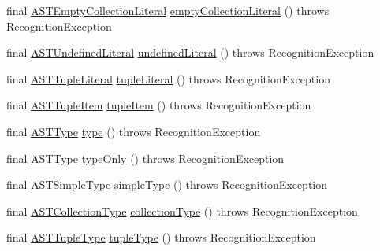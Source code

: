 \begin{DoxyCompactItemize}
\item 
final \hyperlink{classorg_1_1tzi_1_1use_1_1parser_1_1ocl_1_1_a_s_t_empty_collection_literal}{A\-S\-T\-Empty\-Collection\-Literal} \hyperlink{classorg_1_1tzi_1_1use_1_1parser_1_1ocl_1_1_o_c_l_parser_ab2cdacf60ff94da776d96c9db47185f8}{empty\-Collection\-Literal} ()  throws Recognition\-Exception 
\item 
final \hyperlink{classorg_1_1tzi_1_1use_1_1parser_1_1ocl_1_1_a_s_t_undefined_literal}{A\-S\-T\-Undefined\-Literal} \hyperlink{classorg_1_1tzi_1_1use_1_1parser_1_1ocl_1_1_o_c_l_parser_abab2814c454212e9460ff7c628ba40c5}{undefined\-Literal} ()  throws Recognition\-Exception 
\item 
final \hyperlink{classorg_1_1tzi_1_1use_1_1parser_1_1ocl_1_1_a_s_t_tuple_literal}{A\-S\-T\-Tuple\-Literal} \hyperlink{classorg_1_1tzi_1_1use_1_1parser_1_1ocl_1_1_o_c_l_parser_a9a2d5d1e0317db3fae49c21f59e16033}{tuple\-Literal} ()  throws Recognition\-Exception 
\item 
final \hyperlink{classorg_1_1tzi_1_1use_1_1parser_1_1ocl_1_1_a_s_t_tuple_item}{A\-S\-T\-Tuple\-Item} \hyperlink{classorg_1_1tzi_1_1use_1_1parser_1_1ocl_1_1_o_c_l_parser_a1d81ac3a31925270208571c281c97db7}{tuple\-Item} ()  throws Recognition\-Exception 
\item 
final \hyperlink{classorg_1_1tzi_1_1use_1_1parser_1_1ocl_1_1_a_s_t_type}{A\-S\-T\-Type} \hyperlink{classorg_1_1tzi_1_1use_1_1parser_1_1ocl_1_1_o_c_l_parser_ac270f1ea9c8d79437b5bad417b53c680}{type} ()  throws Recognition\-Exception 
\item 
final \hyperlink{classorg_1_1tzi_1_1use_1_1parser_1_1ocl_1_1_a_s_t_type}{A\-S\-T\-Type} \hyperlink{classorg_1_1tzi_1_1use_1_1parser_1_1ocl_1_1_o_c_l_parser_aec30b8bafe5f470a5dcd24bc11e58a6c}{type\-Only} ()  throws Recognition\-Exception 
\item 
final \hyperlink{classorg_1_1tzi_1_1use_1_1parser_1_1ocl_1_1_a_s_t_simple_type}{A\-S\-T\-Simple\-Type} \hyperlink{classorg_1_1tzi_1_1use_1_1parser_1_1ocl_1_1_o_c_l_parser_a602e6f273b4be976f4884b9be3227f5e}{simple\-Type} ()  throws Recognition\-Exception 
\item 
final \hyperlink{classorg_1_1tzi_1_1use_1_1parser_1_1ocl_1_1_a_s_t_collection_type}{A\-S\-T\-Collection\-Type} \hyperlink{classorg_1_1tzi_1_1use_1_1parser_1_1ocl_1_1_o_c_l_parser_a3108d88426363343cd6bae5e0e32fefc}{collection\-Type} ()  throws Recognition\-Exception 
\item 
final \hyperlink{classorg_1_1tzi_1_1use_1_1parser_1_1ocl_1_1_a_s_t_tuple_type}{A\-S\-T\-Tuple\-Type} \hyperlink{classorg_1_1tzi_1_1use_1_1parser_1_1ocl_1_1_o_c_l_parser_a27c9fec8c82cde73b6aab11435098012}{tuple\-Type} ()  throws Recognition\-Exception 

\end{DoxyCompactItemize}
